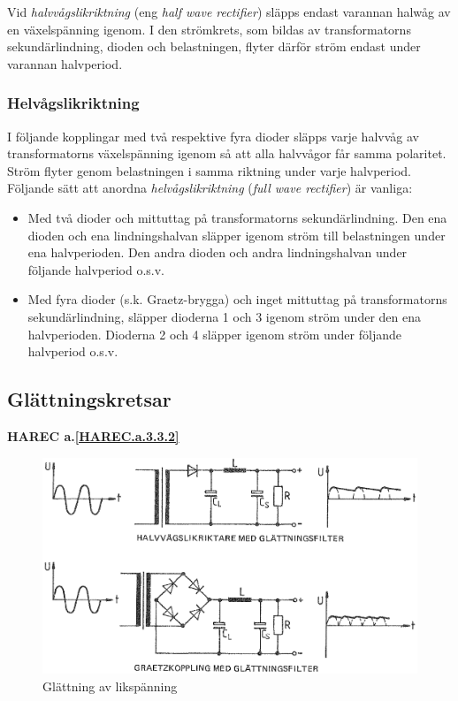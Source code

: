 Vid \emph{halvvågslikriktning} (eng \emph{half wave rectifier}) släpps endast
varannan halwåg av en växelspänning igenom. I den strömkrets, som bildas av
transformatorns sekundärlindning, dioden och belastningen, flyter därför ström
endast under varannan halvperiod.

\subsubsection{Helvågslikriktning}

I följande kopplingar med två respektive fyra dioder släpps varje
halvvåg av transformatorns växelspänning igenom så att alla halvvågor
får samma polaritet. Ström flyter genom belastningen i samma riktning
under varje halvperiod. Följande sätt att anordna \emph{helvågslikriktning}
(\emph{full wave rectifier}) är vanliga:
\begin{itemize}
\item Med två dioder och mittuttag på transformatorns
  sekundärlindning. Den ena dioden och ena lindningshalvan släpper
  igenom ström till belastningen under ena halvperioden. Den andra
  dioden och andra lindningshalvan under följande halvperiod o.s.v.

\item Med fyra dioder (s.k. Graetz-brygga) och inget mittuttag på
  transformatorns sekundärlindning, släpper dioderna 1 och 3 igenom
  ström under den ena halvperioden.  Dioderna 2 och 4 släpper igenom
  ström under följande halvperiod o.s.v.
\end{itemize}

\subsection{Glättningskretsar}
\textbf{HAREC a.\ref{HAREC.a.3.3.2}\label{myHAREC.a.3.3.2}}

\begin{figure}
\includegraphics[width=\textwidth]{images/bild_2_3-36.png}
\caption{Glättning av likspänning}
\label{fig:BildII3-36}
\end{figure}

